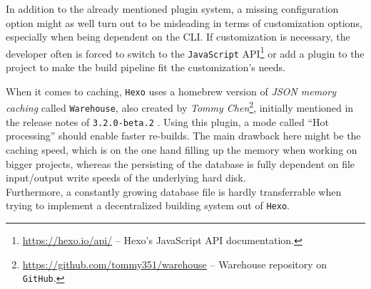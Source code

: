 In addition to the already mentioned plugin system, a missing configuration option might as well turn out to be misleading in terms of customization options, especially when being dependent on the CLI. If customization is necessary, the developer often is forced to switch to the \texttt{JavaScript} API\footnote{\url{https://hexo.io/api/} -- Hexo's JavaScript API documentation.} or add a plugin to the project to make the build pipeline fit the customization's needs.

When it comes to caching, \texttt{Hexo} uses a homebrew version of \emph{JSON memory caching} called \texttt{Warehouse}, also created by \emph{Tommy Chen}\footnote{\url{https://github.com/tommy351/warehouse} -- Warehouse repository on \texttt{GitHub}.}, initially mentioned in the release notes of \texttt{3.2.0-beta.2} \cite{Chen2015hexorelease}. Using this plugin, a mode called ``Hot processing'' should enable faster re-builds. The main drawback here might be the caching speed, which is on the one hand filling up the memory when working on bigger projects, whereas the persisting of the database is fully dependent on file input/output write speeds of the underlying hard disk.\\
Furthermore, a constantly growing database file is hardly transferrable when trying to implement a decentralized building system out of \texttt{Hexo}.

